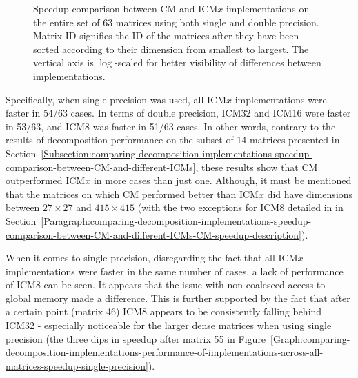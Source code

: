 \begin{figure}[ht!]
\begin{subfigure}{\textwidth}
		\label{Graph:comparing-decomposition-implementations-performance-of-implementations-across-all-matrices-speedup-double-precision}
	\end{subfigure}
	\caption{Speedup comparison between CM and ICM$ x $ implementations on the entire set of 63 matrices using both single and double precision. Matrix ID signifies the ID of the matrices after they have been sorted according to their dimension from smallest to largest. The vertical axis is $ \log $-scaled for better visibility of differences between implementations.}
	\label{Graph:comparing-decomposition-implementations-performance-of-implementations-across-all-matrices-speedup-single-double-precision}
\end{figure}

Specifically, when single precision was used, all ICM$ x $ implementations were faster in 54/63 cases. In terms of double precision, ICM32 and ICM16 were faster in 53/63, and ICM8 was faster in 51/63 cases. In other words, contrary to the results of decomposition performance on the subset of 14 matrices presented in Section~\ref{Subsection:comparing-decomposition-implementations-speedup-comparison-between-CM-and-different-ICMs}, these results show that CM outperformed ICM$ x $ in more cases than just one. Although, it must be mentioned that the matrices on which CM performed better than ICM$ x $ did have dimensions between $ 27\times 27 $ and $ 415\times 415 $ (with the two exceptions for ICM8 detailed in \textit{} in Section~\ref{Paragraph:comparing-decomposition-implementations-speedup-comparison-between-CM-and-different-ICMs-CM-speedup-description}).

\par When it comes to single precision, disregarding the fact that all ICM$ x $ implementations were faster in the same number of cases, a lack of performance of ICM8 can be seen. It appears that the issue with non-coalesced access to global memory made a difference. This is further supported by the fact that after a certain point (matrix 46) ICM8 appears to be consistently falling behind ICM32 - especially noticeable for the larger dense matrices when using single precision (the three dips in speedup after matrix 55 in Figure~\ref{Graph:comparing-decomposition-implementations-performance-of-implementations-across-all-matrices-speedup-single-precision}).

